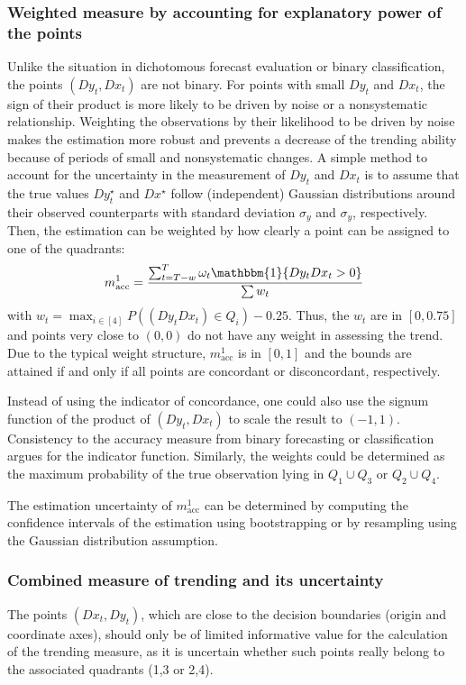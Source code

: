 \documentclass[oneside]{article}
\theoremstyle{plain}%
\theoremstyle{definition}
\newcommand{\ind}[1]{\mathbbm{1}\{#1\}}
\newcommand{\ydiff}{D y}
\newcommand{\ydifft}{Dy^\star}
\newcommand{\xdiff}{Dx}
\newcommand{\xdifft}{Dx^\star}
\begin{document}
\subsubsection{Weighted measure by accounting for explanatory power of the points}\label{subsec:w1}

Unlike the situation in dichotomous forecast evaluation or binary classification, the points $(\ydiff_t, \xdiff_t)$ are not binary.
For points with small $\ydiff_t$ and $\xdiff_t$, the sign of their product is more likely to be driven by noise or a nonsystematic relationship.
Weighting the observations by their likelihood to be driven by noise makes the estimation more robust and prevents a decrease of the trending ability because of periods of small and nonsystematic changes. 
A simple method to account for the uncertainty in the measurement of $\ydiff_t$ and $\xdiff_t$ is to assume that the true values $\ydifft_t$ and $\xdifft$ follow (independent) Gaussian distributions around their observed counterparts with standard deviation $\sigma_y$ and $\sigma_y$, respectively.
Then, the estimation can be weighted by how clearly a point can be assigned to one of the quadrants:
\begin{equation}
    m_{\text{acc}}^1 = \frac{\sum_{t=T-w}^T \omega_t \ind{\ydiff_t \xdiff_t > 0} }{\sum w_t}
\end{equation}
with $w_t = \max_{i \in [4]} P((\ydiff_t \xdiff_t) \in Q_i) - 0.25$.
Thus, the $w_t$ are in $[0, 0.75]$ and points very close to $(0, 0)$ do not have any weight in assessing the trend. 
Due to the typical weight structure, $m_{\text{acc}}^1$ is in $[0,1]$ and the bounds are attained if and only if all points are concordant or disconcordant, respectively.

Instead of using the indicator of concordance, one could also use the signum function of the product of $(\ydiff_t, \xdiff_t)$ to scale the result to $(-1, 1)$.
Consistency to the accuracy measure from binary forecasting or classification argues for the indicator function.
Similarly, the weights could be determined as the maximum probability of the true observation lying in $Q_1 \cup Q_3$ or $Q_2 \cup Q_4$.

The estimation uncertainty of $m_{\text{acc}}^1$ can be determined by computing the confidence intervals of the estimation using bootstrapping or by resampling using the Gaussian distribution assumption.

\subsubsection{Combined measure of trending and its uncertainty} \label{subsec:w2}
The points $(Dx_t, Dy_t)$, which are close to the decision boundaries (origin and coordinate axes), should only be of limited informative value for the calculation of the trending measure, as it is uncertain whether such points really belong to the associated quadrants (1,3 or 2,4).
\end{document}
